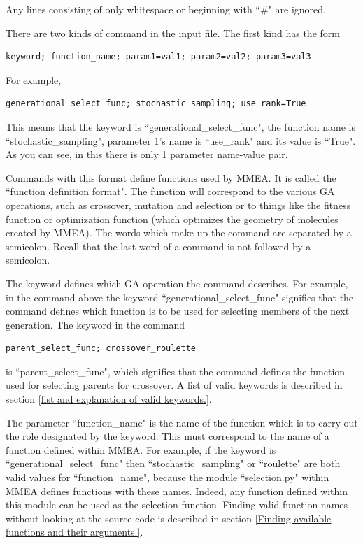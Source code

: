 \documentclass[12pt]{article}
\begin{document}
Any lines consisting of only whitespace or beginning with ``\#" are ignored.

There are two kinds of command in the input file. The first kind has the form
\begin{verbatim}
keyword; function_name; param1=val1; param2=val2; param3=val3
\end{verbatim}
For example, 
\begin{verbatim}
generational_select_func; stochastic_sampling; use_rank=True
\end{verbatim}
This means that the keyword is ``generational\_select\_func", the function name is ``stochastic\_sampling", parameter 1's name is ``use\_rank" and its value is ``True". As you can see, in this there is only 1 parameter name-value pair.

Commands with this format define functions used by MMEA. It is called the ``function definition format". The function will correspond to the various GA operations, such as crossover, mutation and selection or to things like the fitness function or optimization function (which optimizes the geometry of molecules created by MMEA). The words which make up the command are separated by a semicolon. Recall that the last word of a command is not followed by a semicolon. 

The keyword defines which GA operation the command describes. For example, in the command above the keyword ``generational\_select\_func" signifies that the command defines which function is to be used for selecting members of the next generation. The keyword in the command
\begin{verbatim}
parent_select_func; crossover_roulette
\end{verbatim} 
is ``parent\_select\_func", which signifies that the command defines the function used for selecting parents for crossover. A list of valid keywords is described in section \ref{list and explanation of valid keywords.}.

The parameter ``function\_name" is the name of the function which is to carry out the role designated by the keyword. This must correspond to the name of a function defined within MMEA. For example, if the keyword is ``generational\_select\_func" then ``stochastic\_sampling" or ``roulette" are both valid values for ``function\_name", because the module ``selection.py" within MMEA defines functions with these names. Indeed, any function defined within this module can be used as the selection function. Finding valid function names without looking at the source code is described in section \ref{Finding available functions and their arguments.}.
\end{document}
